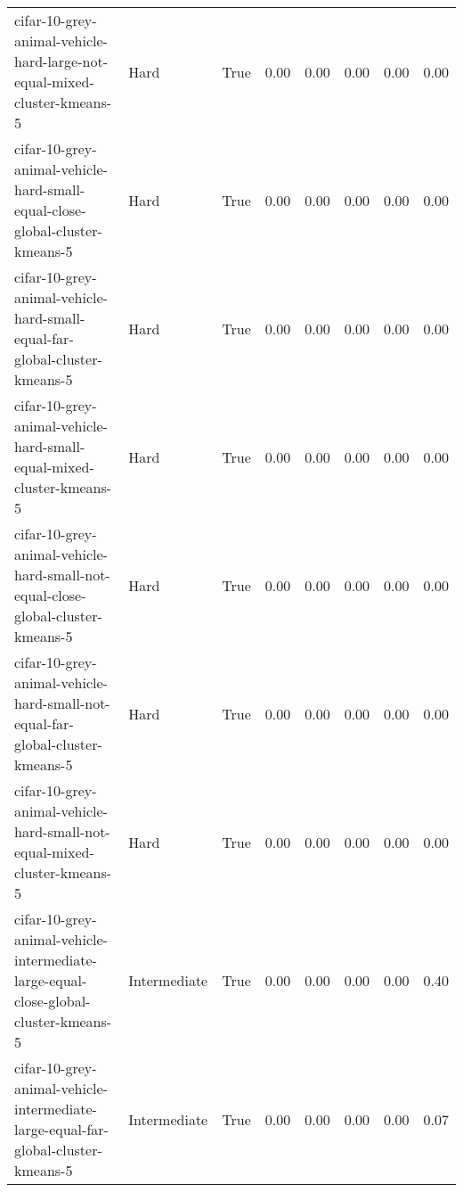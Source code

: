 \begin{longtable}{llllllll}
               cifar-10-grey-animal-vehicle-hard-large-not-equal-mixed-cluster-kmeans-5 &         Hard &        True &                 0.00 &                 0.00 &                         0.00 &                         0.00 &                         0.00 \\
            cifar-10-grey-animal-vehicle-hard-small-equal-close-global-cluster-kmeans-5 &         Hard &        True &                 0.00 &                 0.00 &                         0.00 &                         0.00 &                         0.00 \\
              cifar-10-grey-animal-vehicle-hard-small-equal-far-global-cluster-kmeans-5 &         Hard &        True &                 0.00 &                 0.00 &                         0.00 &                         0.00 &                         0.00 \\
                   cifar-10-grey-animal-vehicle-hard-small-equal-mixed-cluster-kmeans-5 &         Hard &        True &                 0.00 &                 0.00 &                         0.00 &                         0.00 &                         0.00 \\
        cifar-10-grey-animal-vehicle-hard-small-not-equal-close-global-cluster-kmeans-5 &         Hard &        True &                 0.00 &                 0.00 &                         0.00 &                         0.00 &                         0.00 \\
          cifar-10-grey-animal-vehicle-hard-small-not-equal-far-global-cluster-kmeans-5 &         Hard &        True &                 0.00 &                 0.00 &                         0.00 &                         0.00 &                         0.00 \\
               cifar-10-grey-animal-vehicle-hard-small-not-equal-mixed-cluster-kmeans-5 &         Hard &        True &                 0.00 &                 0.00 &                         0.00 &                         0.00 &                         0.00 \\
    cifar-10-grey-animal-vehicle-intermediate-large-equal-close-global-cluster-kmeans-5 & Intermediate &        True &                 0.00 &                 0.00 &                         0.00 &                         0.00 &                         0.40 \\
      cifar-10-grey-animal-vehicle-intermediate-large-equal-far-global-cluster-kmeans-5 & Intermediate &        True &                 0.00 &                 0.00 &                         0.00 &                         0.00 &                         0.07 \\

\end{longtable}
